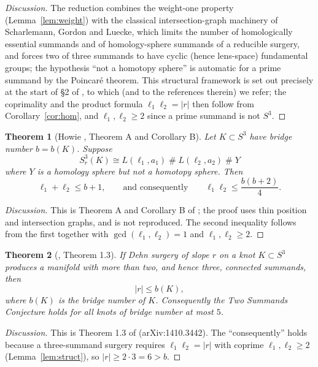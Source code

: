 \documentclass[11pt]{amsart}
\newtheorem{theorem}{Theorem}[section]
\theoremstyle{definition}
\theoremstyle{remark}
\numberwithin{equation}{section}
\begin{document}
\begin{proof}[Discussion]
The reduction combines the weight-one property
(Lemma~\ref{lem:weight}) with the classical intersection-graph machinery
of Scharlemann, Gordon and Luecke, which limits the number of
homologically essential summands and of homology-sphere summands of a
reducible surgery, and forces two of three summands to have cyclic (hence
lens-space) fundamental groups; the hypothesis ``not a homotopy sphere''
is automatic for a prime summand by the Poincar\'e theorem. This
structural framework is set out precisely at the start of \S2 of
\cite{Howie}, to which (and to the references therein) we refer; the
coprimality and the product formula $\ell_{1}\ell_{2}=|r|$ then follow
from Corollary~\ref{cor:hom}, and $\ell_{1},\ell_{2}\ge2$ since a prime
summand is not $S^{3}$.
\end{proof}

\begin{theorem}[Howie \cite{Howie}, Theorem A and Corollary B]\label{thm:howie}
Let $K\subset S^{3}$ have bridge number $b=b(K)$. Suppose
\[
S^{3}_{r}(K)\cong L(\ell_{1},a_{1})\;\#\;L(\ell_{2},a_{2})\;\#\;Y
\]
where $Y$ is a homology sphere but not a homotopy sphere. Then
\[
\ell_{1}+\ell_{2}\le b+1,
\qquad\text{and consequently}\qquad
\ell_{1}\ell_{2}\le \frac{b(b+2)}{4}.
\]
\end{theorem}

\begin{proof}[Discussion]
This is Theorem A and Corollary B of \cite{Howie}; the proof uses thin
position and intersection graphs, and is not reproduced. The second
inequality follows from the first together with
$\gcd(\ell_{1},\ell_{2})=1$ and $\ell_{1},\ell_{2}\ge2$.
\end{proof}

\begin{theorem}[{\cite{GW}, Theorem 1.3}]\label{thm:gw}
If Dehn surgery of slope $r$ on a knot $K\subset S^{3}$ produces a
manifold with more than two, and hence three, connected summands, then
\[
|r|\le b(K),
\]
where $b(K)$ is the bridge number of $K$. Consequently the Two Summands
Conjecture holds for all knots of bridge number at most $5$.
\end{theorem}

\begin{proof}[Discussion]
This is Theorem 1.3 of \cite{GW} (arXiv:1410.3442). The ``consequently''
holds because a three-summand surgery requires
$\ell_{1}\ell_{2}=|r|$ with coprime $\ell_{1},\ell_{2}\ge2$
(Lemma~\ref{lem:struct}), so $|r|\ge 2\cdot3=6>b$.
\end{proof}
\end{document}
